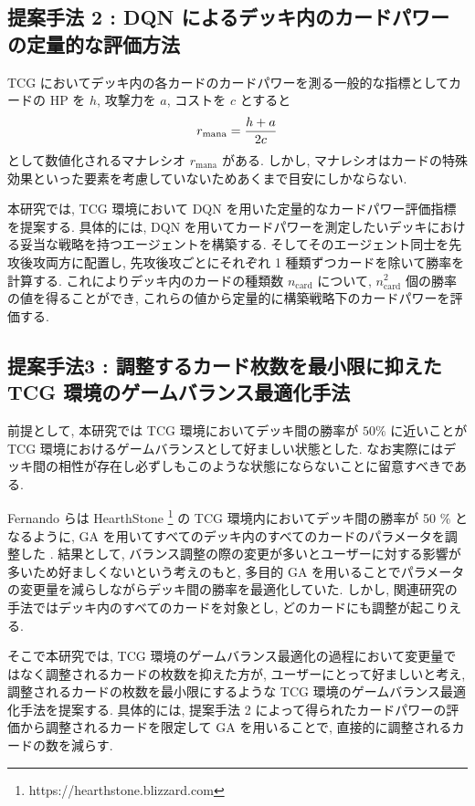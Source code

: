 \documentclass[twocolumn]{jarticle}
\begin{document}
\subsection{提案手法 2 : DQN によるデッキ内のカードパワーの定量的な評価方法}
\label{manaratio}
TCG においてデッキ内の各カードのカードパワーを測る一般的な指標としてカードの HP を $h$, 攻撃力を $a$, コストを $c$ とすると
\begin{equation*}
   \small
   r_\mathrm{mana} = \frac{h+a}{2c}
\end{equation*}
として数値化されるマナレシオ $r_\mathrm{mana}$ がある. 
しかし, マナレシオはカードの特殊効果といった要素を考慮していないためあくまで目安にしかならない. \par
本研究では, TCG 環境において DQN を用いた定量的なカードパワー評価指標を提案する.
具体的には, DQN を用いてカードパワーを測定したいデッキにおける妥当な戦略を持つエージェントを構築する. 
そしてそのエージェント同士を先攻後攻両方に配置し, 先攻後攻ごとにそれぞれ 1 種類ずつカードを除いて勝率を計算する. これによりデッキ内のカードの種類数 $n_{\mathrm{card}}$ について, $n_{\mathrm{card}}^2$ 個の勝率の値を得ることができ, これらの値から定量的に構築戦略下のカードパワーを評価する. 

\subsection{提案手法3 : 調整するカード枚数を最小限に抑えた TCG 環境のゲームバランス最適化手法}
\label{hearthstone}
前提として, 本研究では TCG 環境においてデッキ間の勝率が $50\%$ に近いことが TCG 環境におけるゲームバランスとして好ましい状態とした. なお実際にはデッキ間の相性が存在し必ずしもこのような状態にならないことに留意すべきである.
\par
Fernando らは HearthStone \footnote[1]{https://hearthstone.blizzard.com} の TCG 環境内においてデッキ間の勝率が 50 \% となるように, GA を用いてすべてのデッキ内のすべてのカードのパラメータを調整した \cite{Hearthstone}.
結果として, バランス調整の際の変更が多いとユーザーに対する影響が多いため好ましくないという考えのもと, 多目的 GA を用いることでパラメータの変更量を減らしながらデッキ間の勝率を最適化していた.
しかし, 関連研究の手法ではデッキ内のすべてのカードを対象とし, どのカードにも調整が起こりえる.
\par
そこで本研究では, TCG 環境のゲームバランス最適化の過程において変更量ではなく調整されるカードの枚数を抑えた方が, ユーザーにとって好ましいと考え, 調整されるカードの枚数を最小限にするような TCG 環境のゲームバランス最適化手法を提案する.
具体的には, 提案手法 2 によって得られたカードパワーの評価から調整されるカードを限定して GA を用いることで, 直接的に調整されるカードの数を減らす.
\vspace{-0.20cm}
\end{document}
